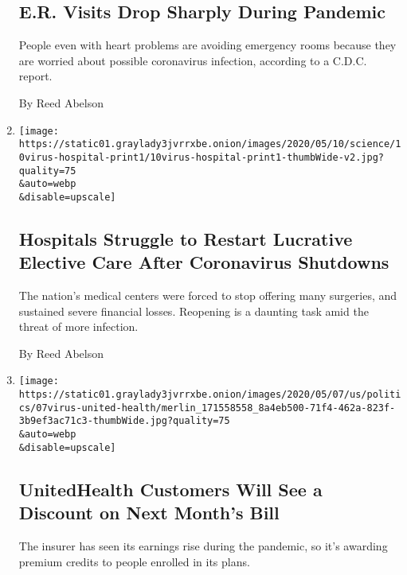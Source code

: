 \begin{enumerate}
  \hypertarget{er-visits-drop-sharply-during-pandemic}{%
  \subsection{E.R. Visits Drop Sharply During
  Pandemic}\label{er-visits-drop-sharply-during-pandemic}}

  People even with heart problems are avoiding emergency rooms because
  they are worried about possible coronavirus infection, according to a
  C.D.C. report.

  By Reed Abelson
\item
  \href{/2020/05/09/health/hospitals-coronavirus-reopening.html}{}

  \texttt{[image: https://static01.graylady3jvrrxbe.onion/images/2020/05/10/science/10virus-hospital-print1/10virus-hospital-print1-thumbWide-v2.jpg?quality=75\\\&auto=webp\\\&disable=upscale]}

  \hypertarget{hospitals-struggle-to-restart-lucrative-elective-care-after-coronavirus-shutdowns}{%
  \subsection{Hospitals Struggle to Restart Lucrative Elective Care
  After Coronavirus
  Shutdowns}\label{hospitals-struggle-to-restart-lucrative-elective-care-after-coronavirus-shutdowns}}

  The nation's medical centers were forced to stop offering many
  surgeries, and sustained severe financial losses. Reopening is a
  daunting task amid the threat of more infection.

  By Reed Abelson
\item
  \href{/2020/05/07/health/unitedhealth-coronavirus.html}{}

  \texttt{[image: https://static01.graylady3jvrrxbe.onion/images/2020/05/07/us/politics/07virus-united-health/merlin\_171558558\_8a4eb500-71f4-462a-823f-3b9ef3ac71c3-thumbWide.jpg?quality=75\\\&auto=webp\\\&disable=upscale]}

  \hypertarget{unitedhealth-customers-will-see-a-discount-on-next-months-bill}{%
  \subsection{UnitedHealth Customers Will See a Discount on Next Month's
  Bill}\label{unitedhealth-customers-will-see-a-discount-on-next-months-bill}}

  The insurer has seen its earnings rise during the pandemic, so it's
  awarding premium credits to people enrolled in its plans.


\end{enumerate}
